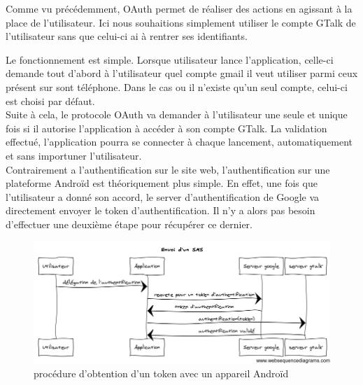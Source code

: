 Comme vu précédemment, OAuth permet de réaliser des actions en agissant à la place de l'utilisateur. 
Ici nous souhaitions simplement utiliser le compte GTalk de l'utilisateur sans que celui-ci ai à rentrer
ses identifiants. 

Le fonctionnement est simple. Lorsque utilisateur lance l'application, celle-ci demande tout d'abord
à l'utilisateur quel compte gmail il veut utiliser parmi ceux présent sur sont téléphone. Dans le cas
ou il n'existe qu'un seul compte, celui-ci est choisi par défaut.
\\


Suite à cela, le protocole OAuth va demander à l'utilisateur une seule et unique fois si il autorise 
l'application à accéder à son compte GTalk. La validation effectué, l'application pourra se connecter 
à chaque lancement, automatiquement et sans importuner l'utilisateur. 
\\


Contrairement a l'authentification sur le site web, l'authentification sur une plateforme Androïd est
théoriquement plus simple. En effet, une fois que l'utilisateur a donné son accord, le server 
d'authentification de Google va directement envoyer le token d'authentification. Il n'y a alors pas 
besoin d'effectuer une deuxième étape pour récupérer ce dernier.



\begin{figure}[!h]
	\center
	\includegraphics[width=15cm]{img/obtention-token-avec-Android.png}
	\caption{procédure d'obtention d'un token avec un appareil Androïd}
\end{figure}


